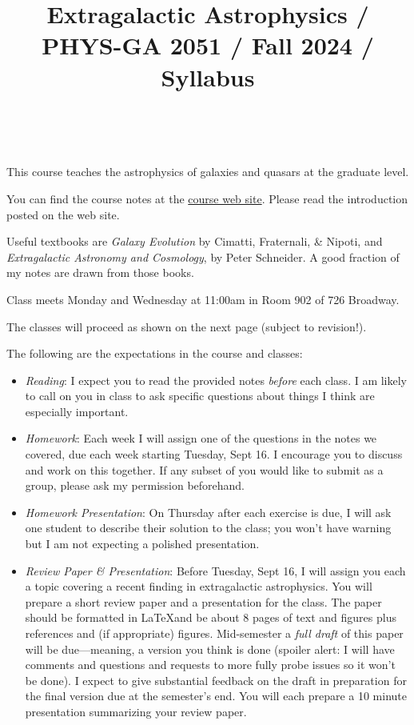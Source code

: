 \documentclass[11pt, preprint]{aastex}
\begin{document}
\title{\bf Extragalactic Astrophysics / PHYS-GA 2051 / Fall 2024 / Syllabus }

~

\noindent This course teaches the astrophysics of galaxies and quasars
at the graduate level.

\noindent You can find the course notes at the
\href{http://blanton144.github.io/exex}{course web site}. Please read
the introduction posted on the web site.

\noindent Useful textbooks are {\it Galaxy Evolution} by Cimatti,
Fraternali, \& Nipoti, and {\it Extragalactic Astronomy and
  Cosmology}, by Peter Schneider. A good fraction of my notes are
drawn from those books.

\noindent Class meets Monday and Wednesday at 11:00am in Room 902 of
726 Broadway.

\noindent The classes will proceed as shown on the next page (subject
to revision!).

\noindent The following are the expectations in the course and
classes:

\begin{itemize}

\item {\it Reading}: I expect you to read the provided notes {\it
  before} each class. I am likely to call on you in class to ask 
  specific questions about things I think are especially important.

\item {\it Homework}: Each week I will assign one of the questions in
  the notes we covered, due each week starting Tuesday, Sept 16. I
  encourage you to discuss and work on this together. If any subset of
  you would like to submit as a group, please ask my permission
  beforehand.

\item {\it Homework Presentation}: On Thursday after each exercise is
  due, I will ask one student to describe their solution to the class;
  you won't have warning but I am not expecting a polished
  presentation.

\item {\it Review Paper \& Presentation}: Before Tuesday, Sept 16, I
  will assign you each a topic covering a recent finding in
  extragalactic astrophysics. You will prepare a short review paper
  and a presentation for the class. The paper should be formatted in
  \LaTeX and be about 8 pages of text and figures plus references and
  (if appropriate) figures. Mid-semester a {\it full draft} of this
  paper will be due---meaning, a version you think is done (spoiler
  alert: I will have comments and questions and requests to more fully
  probe issues so it won't be done). I expect to give substantial
  feedback on the draft in preparation for the final version due at
  the semester's end. You will each prepare a 10 minute presentation
  summarizing your review paper.

\end{itemize}
\end{document}
